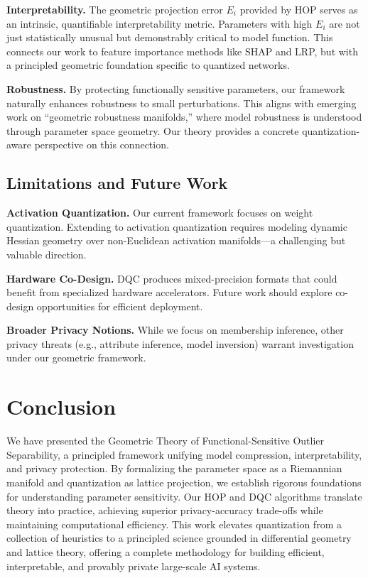 \documentclass[letterpaper,twocolumn,10pt]{article}
\begin{document}
\textbf{Interpretability.} The geometric projection error $E_i$ provided by HOP serves as an intrinsic, quantifiable interpretability metric. Parameters with high $E_i$ are not just statistically unusual but demonstrably critical to model function. This connects our work to feature importance methods like SHAP and LRP, but with a principled geometric foundation specific to quantized networks.

\textbf{Robustness.} By protecting functionally sensitive parameters, our framework naturally enhances robustness to small perturbations. This aligns with emerging work on ``geometric robustness manifolds,'' where model robustness is understood through parameter space geometry. Our theory provides a concrete quantization-aware perspective on this connection.

\subsection{Limitations and Future Work}

\textbf{Activation Quantization.} Our current framework focuses on weight quantization. Extending to activation quantization requires modeling dynamic Hessian geometry over non-Euclidean activation manifolds---a challenging but valuable direction.

\textbf{Hardware Co-Design.} DQC produces mixed-precision formats that could benefit from specialized hardware accelerators. Future work should explore co-design opportunities for efficient deployment.

\textbf{Broader Privacy Notions.} While we focus on membership inference, other privacy threats (e.g., attribute inference, model inversion) warrant investigation under our geometric framework.

\section{Conclusion}
\label{sec:conclusion}

We have presented the Geometric Theory of Functional-Sensitive Outlier Separability, a principled framework unifying model compression, interpretability, and privacy protection. By formalizing the parameter space as a Riemannian manifold and quantization as lattice projection, we establish rigorous foundations for understanding parameter sensitivity. Our HOP and DQC algorithms translate theory into practice, achieving superior privacy-accuracy trade-offs while maintaining computational efficiency. This work elevates quantization from a collection of heuristics to a principled science grounded in differential geometry and lattice theory, offering a complete methodology for building efficient, interpretable, and provably private large-scale AI systems.
\end{document}

